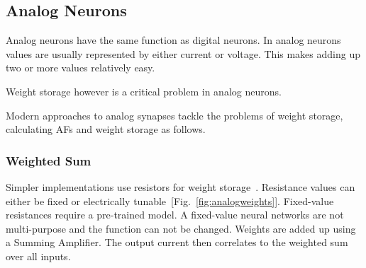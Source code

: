 \documentclass[conference]{IEEEtran}
\begin{document}



    \subsection{Analog Neurons}

    Analog neurons have the same function as digital neurons.
    In analog neurons values are usually represented by either current or voltage.
    This makes adding up two or more values relatively easy.

    Weight storage however is a critical problem in analog neurons.

    Modern approaches to analog synapses tackle the problems of weight storage, calculating AFs and weight storage as follows.

    \subsubsection{Weighted Sum}


    Simpler implementations use resistors for weight storage~\cite{zurada1992analog}.
    Resistance values can either be fixed or electrically tunable~[Fig.~\ref{fig:analogweights}].
    Fixed-value resistances require a pre-trained model.
    A fixed-value neural networks are not multi-purpose and the function can not be changed.
    Weights are added up using a Summing Amplifier.
    The output current then correlates to the weighted sum over all inputs.

\end{document}
